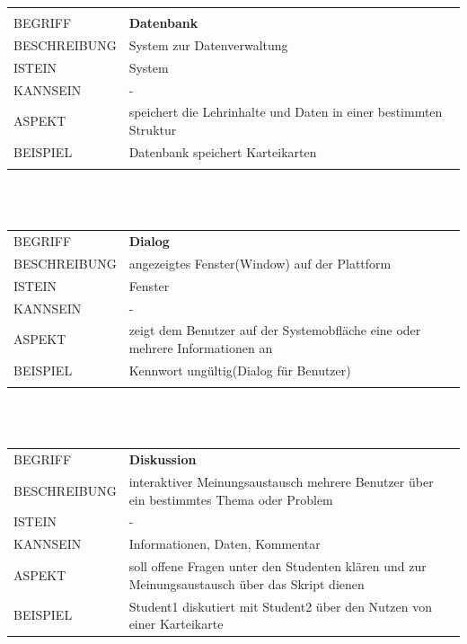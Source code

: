 \documentclass[12pt,a4paper]{article}
\begin{document}
\begin{tabular}{l p{12cm}}
\hline\\
BEGRIFF 	 & \textbf{Datenbank} \\ 
BESCHREIBUNG & System zur Datenverwaltung\\ 
ISTEIN   	 & System\\
KANNSEIN 	 & - \\ 
ASPEKT   	 & speichert die Lehrinhalte und Daten in einer bestimmten Struktur\\
BEISPIEL 	 & Datenbank speichert Karteikarten\\\\
\hline
\end{tabular}\\\\ 

\begin{tabular}{l p{12cm}}
BEGRIFF 	 & \textbf{Dialog} \\ 
BESCHREIBUNG & angezeigtes Fenster(Window) auf der Plattform\\ 
ISTEIN   	 & Fenster\\
KANNSEIN 	 & - \\ 
ASPEKT   	 & zeigt dem Benutzer auf der Systemobfläche eine oder mehrere Informationen an\\
BEISPIEL 	 & Kennwort ungültig(Dialog für Benutzer)\\\\
\hline
\end{tabular}\\\\  

\begin{tabular}{l p{12cm}}
BEGRIFF 	 & \textbf{Diskussion} \\ 
BESCHREIBUNG & interaktiver Meinungsaustausch mehrere Benutzer über ein bestimmtes Thema oder Problem\\ 
ISTEIN   	 & -\\
KANNSEIN 	 & Informationen, Daten, Kommentar\\ 
ASPEKT   	 & soll offene Fragen unter den Studenten klären und zur Meinungsaustausch über das Skript dienen \\
BEISPIEL 	 & Student1 diskutiert mit Student2 über den Nutzen von einer Karteikarte \\
\hline
\end{tabular}\\\\  
\end{document}
